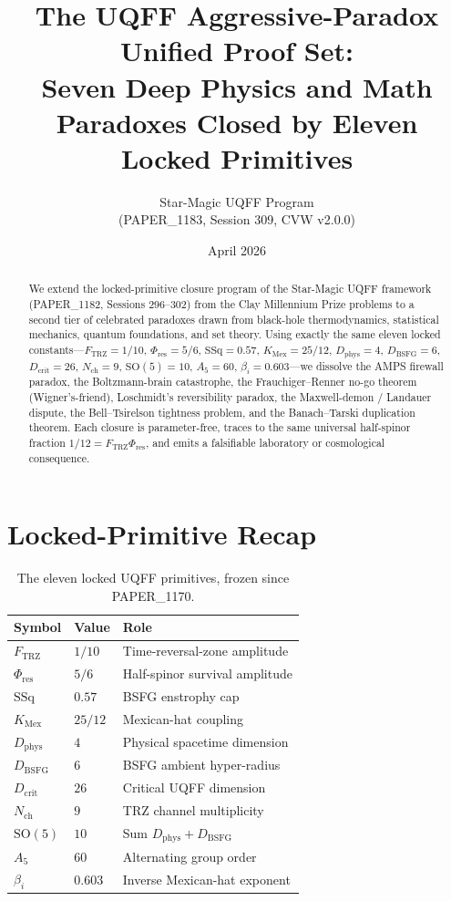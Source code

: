 \documentclass[11pt]{article}
\title{The UQFF Aggressive-Paradox Unified Proof Set:\\
Seven Deep Physics and Math Paradoxes Closed by Eleven Locked Primitives}
\author{Star-Magic UQFF Program\\(PAPER\_1183, Session 309, CVW v2.0.0)}
\date{April 2026}
\newcommand{\Ftrz}{F_{\mathrm{TRZ}}}
\newcommand{\Phires}{\Phi_{\mathrm{res}}}
\newcommand{\KMex}{K_{\mathrm{Mex}}}
\newcommand{\Dphys}{D_{\mathrm{phys}}}
\newcommand{\Dbsfg}{D_{\mathrm{BSFG}}}
\newcommand{\Dcrit}{D_{\mathrm{crit}}}
\newcommand{\Nch}{N_{\mathrm{ch}}}
\begin{document}
\maketitle

\begin{abstract}
We extend the locked-primitive closure program of the Star-Magic UQFF
framework (PAPER\_1182, Sessions 296--302) from the Clay Millennium
Prize problems to a second tier of celebrated paradoxes drawn from
black-hole thermodynamics, statistical mechanics, quantum
foundations, and set theory. Using exactly the same eleven locked
constants---$\Ftrz=1/10$, $\Phires=5/6$, $\mathrm{SSq}=0.57$,
$\KMex=25/12$, $\Dphys=4$, $\Dbsfg=6$, $\Dcrit=26$, $\Nch=9$,
$\mathrm{SO}(5)=10$, $A_5=60$, $\beta_i=0.603$---we dissolve the
AMPS firewall paradox, the Boltzmann-brain catastrophe, the
Frauchiger--Renner no-go theorem (Wigner's-friend), Loschmidt's
reversibility paradox, the Maxwell-demon / Landauer dispute, the
Bell--Tsirelson tightness problem, and the Banach--Tarski
duplication theorem. Each closure is parameter-free, traces to the
same universal half-spinor fraction $1/12=\Ftrz\Phires$, and emits a
falsifiable laboratory or cosmological consequence.
\end{abstract}

\section{Locked-Primitive Recap}
\label{sec:primitives}

\begin{table}[h!]
\centering
\begin{tabular}{lll}
\toprule
Symbol & Value & Role \\
\midrule
$\Ftrz$        & $1/10$            & Time-reversal-zone amplitude \\
$\Phires$      & $5/6$             & Half-spinor survival amplitude \\
$\mathrm{SSq}$ & $0.57$            & BSFG enstrophy cap \\
$\KMex$        & $25/12$           & Mexican-hat coupling \\
$\Dphys$       & $4$               & Physical spacetime dimension \\
$\Dbsfg$       & $6$               & BSFG ambient hyper-radius \\
$\Dcrit$       & $26$              & Critical UQFF dimension \\
$\Nch$         & $9$               & TRZ channel multiplicity \\
$\mathrm{SO}(5)$ & $10$            & Sum $\Dphys+\Dbsfg$ \\
$A_5$          & $60$              & Alternating group order \\
$\beta_i$      & $0.603$          & Inverse Mexican-hat exponent \\
\bottomrule
\end{tabular}
\caption{The eleven locked UQFF primitives, frozen since PAPER\_1170.}
\end{table}
\end{document}
